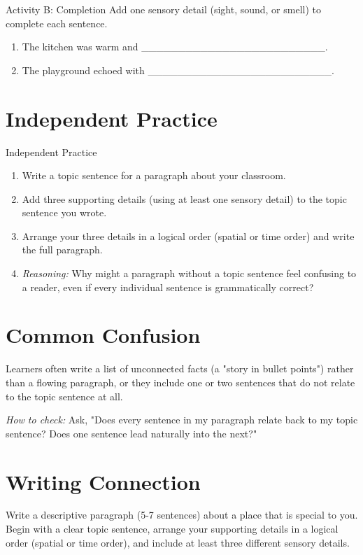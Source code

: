 \begin{activitybox}{Activity B: Completion}
Add one sensory detail (sight, sound, or smell) to complete each sentence.
\begin{enumerate}
    \item The kitchen was warm and \_\_\_\_\_\_\_\_\_\_\_\_\_\_\_\_\_\_\_\_\_\_\_\_\_.
    \item The playground echoed with \_\_\_\_\_\_\_\_\_\_\_\_\_\_\_\_\_\_\_\_\_\_\_\_\_.
\end{enumerate}
\end{activitybox}

\section{Independent Practice}
\begin{activitybox}{Independent Practice}
\begin{enumerate}
    \item Write a topic sentence for a paragraph about your classroom.
    \item Add three supporting details (using at least one sensory detail) to the topic sentence you wrote.
    \item Arrange your three details in a logical order (spatial or time order) and write the full paragraph.
    \item \textit{Reasoning:} Why might a paragraph without a topic sentence feel confusing to a reader, even if every individual sentence is grammatically correct?
\end{enumerate}
\end{activitybox}

\section{Common Confusion}
\begin{warningbox}
Learners often write a list of unconnected facts (a "story in bullet points") rather than a flowing paragraph, or they include one or two sentences that do not relate to the topic sentence at all.

\textit{How to check:} Ask, "Does every sentence in my paragraph relate back to my topic sentence? Does one sentence lead naturally into the next?"
\end{warningbox}

\section{Writing Connection}
Write a descriptive paragraph (5-7 sentences) about a place that is special to you. Begin with a clear topic sentence, arrange your supporting details in a logical order (spatial or time order), and include at least three different sensory details.

